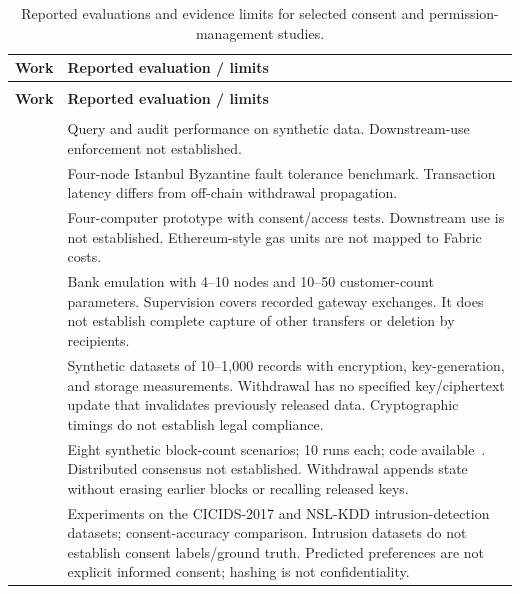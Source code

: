 \begin{longtable}{@{}>{\raggedright\arraybackslash}m{}>{\raggedright\arraybackslash}m{}@{}}
\caption{Reported evaluations and evidence limits for selected consent and permission-management studies.}\label{tab:consent-evaluation} \\
\toprule
\textbf{Work} & \textbf{Reported evaluation / limits} \\
\midrule
\endfirsthead
\multicolumn{2}{l}{\tablename\ \thetable\ (continued)} \\
\toprule
\textbf{Work} & \textbf{Reported evaluation / limits} \\
\midrule
\endhead
\multicolumn{2}{r}{Continued on the next page} \\
\endfoot
\bottomrule
\endlastfoot
\cite{updateCan2024AuditableConsent} & Query and audit performance on synthetic data. Downstream-use enforcement not established. \\
\addlinespace[5pt]
\cite{updateJaved2024SecureConsent} & Four-node Istanbul Byzantine fault tolerance benchmark. Transaction latency differs from off-chain withdrawal propagation. \\
\addlinespace[5pt]
\cite{updateRohini2024SmartConsent} & Four-computer prototype with consent/access tests. Downstream use is not established. Ethereum-style gas units are not mapped to Fabric costs. \\
\addlinespace[5pt]
\cite{updateGhosh2024Banking} & Bank emulation with 4--10 nodes and 10--50 customer-count parameters. Supervision covers recorded gateway exchanges. It does not establish complete capture of other transfers or deletion by recipients. \\
\addlinespace[5pt]
\cite{updateRao2024Genomic} & Synthetic datasets of 10--1,000 records with encryption, key-generation, and storage measurements. Withdrawal has no specified key/ciphertext update that invalidates previously released data. Cryptographic timings do not establish legal compliance. \\
\addlinespace[5pt]
\cite{updateAyala2024DataConsent} & Eight synthetic block-count scenarios; 10 runs each; code available~\cite{softwareAyala2024Consent}. Distributed consensus not established. Withdrawal appends state without erasing earlier blocks or recalling released keys. \\
\addlinespace[5pt]
\cite{updateDeepthika2024ConsentLSTM} & Experiments on the CICIDS-2017 and NSL-KDD intrusion-detection datasets; consent-accuracy comparison. Intrusion datasets do not establish consent labels/ground truth. Predicted preferences are not explicit informed consent; hashing is not confidentiality. \\

\end{longtable}
